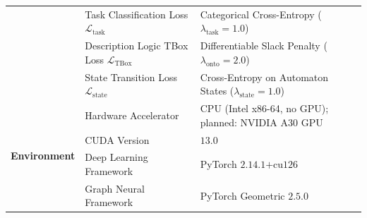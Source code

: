 \documentclass[11pt,a4paper]{article}
\begin{document}
\begin{table}[!ht]
\begin{tabularx}{\textwidth}{@{}l p{5.2cm} X@{}}
& Task Classification Loss $\mathcal{L}_{\mathrm{task}}$ & Categorical Cross-Entropy ($\lambda_{\mathrm{task}} = 1.0$) \\
& Description Logic TBox Loss $\mathcal{L}_{\mathrm{TBox}}$ & Differentiable Slack Penalty ($\lambda_{\mathrm{onto}} = 2.0$) \\
& State Transition Loss $\mathcal{L}_{\mathrm{state}}$ & Cross-Entropy on Automaton States ($\lambda_{\mathrm{state}} = 1.0$) \\
\midrule
\multirow{4}{*}{\textbf{Environment}}
& Hardware Accelerator & CPU (Intel x86-64, no GPU); planned: NVIDIA A30 GPU \\
& CUDA Version & $13.0$ \\
& Deep Learning Framework & PyTorch $2.14.1\text{+cu126}$ \\
& Graph Neural Framework & PyTorch Geometric $2.5.0$ \\
\bottomrule
\end{tabularx}
\end{table}
\end{document}
